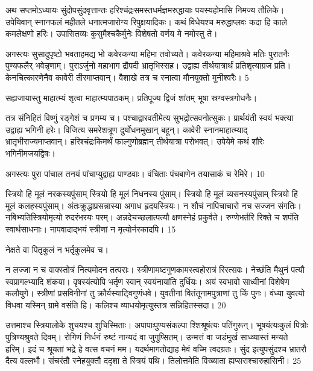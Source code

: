 अथ सप्तमोऽध्यायः
सुंदोपसुंदवृत्तान्तः हरिश्चंद्रःसमस्तधर्मज्ञमरुद्धायाः
पयस्यहोमासि निमज्य तौलिके।
 उपेयिवान् स्नानफलं महीतले
धनात्मजारोग्य रिपुक्षयादिकः।
 कथं विधेयश्च मरुद्धाप्लवः कदा हि
काले कमलेक्षणो हरिः।
 उपासितव्यः कुसुमैश्चकैर्मुनेः विशेषतो
वर्णय मे नमोस्तु ते।

अगस्त्यः
सुसादुपृष्टो भवताहमद्य भो कवेरकन्या महिमा तवोच्यते।
 कवेरकन्या महिमाश्रवे मतिः पुरातनैः
पुण्यफलैर् भवेन्नृणाम्।
 पुराऽर्जुनो महाभाग द्रौपदी भ्रातृभिस्सह।
 उद्वाह्य तीर्थयात्रार्थं प्रतिशृत्याग्रज प्रति।
 केनचित्कारणेनैव कावेरी तीरमाप्तवान्।
 वैशाखे तत्र च स्नात्वा मौनयुक्तो मुनीश्वरैः।
 5

  सह्यजायास्तु माहात्म्यं शृत्वा माहात्म्यपाठकम्।
 प्रतिपूज्य द्विजं शांतम् भूषा स्रग्वस्त्रगोधनैः।
 
तत्र संनिहितं विष्णुं रङ्गेशं च प्रणम्य च।
 पश्चाद्वारवतीमेत्य सुभद्रोत्सवनोत्सुकः।
 प्रार्थयंती स्वयं भक्त्या उद्वाह्य भगिनी हरेः।
 विजित्य समरेशत्रूण दुर्योधनमुखान् बहून्।
 कावेरी स्नानमाहात्म्याद् भ्रातृभीराज्यमाप्तवान्।
 हरिश्चंद्रःकिमर्थं फाल्गुणोब्रह्मन् तीर्थयात्रा परोभवत्।
 उपेयेमे कथं शौरेः भगिनीमजयद्विषः।
 
अगस्त्यः
पुरा पांचाल तनयं पांचाप्युद्वाह्य पाण्डवाः।
 वंचिताः पंचबाणेन तयासाकं च रेमिरे।
 10

  स्त्रियो हि मूलं नरकस्यपुंसाम् स्त्रियो
हि मूलं निधनस्य पुंसाम्।
 स्त्रियो हि मूलं व्यसनस्यपुंसाम् स्त्रियो
हि मूलं कलहस्यपुंसाम्।
 अंतःक्रुद्धाप्रसन्नास्या अगाध हृदयस्त्रियः।
 न शौचं नापिचाचारो नच सज्जन संगतिः।
 नबिभ्यतिस्त्रियोमृत्यो रुदरंभरयः परम्।
 अन्नदेचच्छलात्पत्यौ क्षणस्नेहं प्रकुर्वते।
 रुग्णेभर्तरि रिक्ते च शपंति स्वार्थसाधनाः।
 नापवादाद्भयं स्त्रीणां न मृत्योर्नरकादपि।
 15

  नेक्षते वा पितृकुलं न भर्तृकुलमेव च।
 
न लज्जा न च वाक्स्तोत्रं नित्यमोदन तत्पराः।
 स्त्रीणामष्टगुणकामस्त्वहोरात्रं रिरत्सवः।
 नेच्छंति मैथुनं पत्यौ स्वप्रागल्भ्यादि शंकया।
 वृषस्यंत्योपि भर्तृण स्वान् स्वयंनायांति दुर्धियः।
 अयं स्वभावो साध्वीनां विशेषेण कलौयुगे।
 स्त्रीणां प्रसविनीनां तु क्रौर्यस्याट्विगुणंधवे।
 युवतीनां वितंतूनामपुत्राणां तु किं पुनः।
 वंध्या युवत्यो विधवा यस्मिन् ग्रामे वसंति हि।
 कलिश्च व्याधयोमृत्युस्तत्र सन्निहितस्सदा।
 20

  उत्तमाश्च स्त्रियालोके शुचयश्च शुचिस्मिताः।
 अपापाःपुण्यसंकल्पा श्शिश्रूषंत्यः पतिंगुरून्।
 भूषयंत्यःकुलं पित्रोः पुत्रिण्यश्रुवते दिवम्।
 रोगिणं निर्धनं रुष्टं नान्यदं वा जुगुप्सितम्।
 उन्मत्तं वा जडंमूर्ख साध्व्यास्तं मन्यते हरिम्।
 इदं च श्रूयतां भद्रे हे वत्स वचनं मम।
 यदर्थमागतोद्याह मेवं वच्मि त्वदग्रतः।
 सुंद इत्युपसुंदश्च भ्रातरौ दैत्य वल्लभौ।
 संचरंतौ स्नेहयुक्तौ ददृशा ते स्त्रियं पथि।
 तिलोत्तमेति विख्याता ह्यप्सराश्चारुहासिनी।
 25

